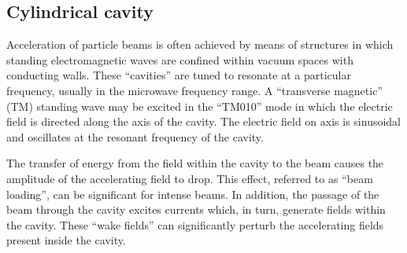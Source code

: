 \subsection{Cylindrical cavity}

Acceleration of particle beams is often achieved by means of
structures in which standing electromagnetic waves are confined within
vacuum spaces with conducting walls.
These ``cavities'' are tuned to resonate at a particular frequency,
usually in the microwave frequency range.
A ``transverse magnetic'' (TM) standing wave may be excited in the
``TM010'' mode in which the electric field is directed along the axis
of the cavity. 
The electric field on axis is sinusoidal and oscillates at the
resonant frequency of the cavity.

The transfer of energy from the field within the cavity to the beam
causes the amplitude of the accelerating field to drop.
This effect, referred to as ``beam loading'', can be significant for
intense beams.
In addition, the passage of the beam through the cavity excites
currents which, in turn, generate fields within the cavity.
These ``wake fields'' can significantly perturb the accelerating
fields present inside the cavity.

